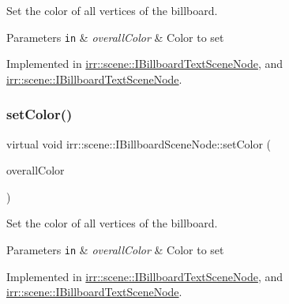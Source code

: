 Set the color of all vertices of the billboard. 


\begin{DoxyParams}[1]{Parameters}
\mbox{\tt in}  & {\em overall\+Color} & Color to set \\
\hline
\end{DoxyParams}


Implemented in \hyperlink{classirr_1_1scene_1_1IBillboardTextSceneNode_aaa65d10d3a49206728c47b148a64bb4a}{irr\+::scene\+::\+I\+Billboard\+Text\+Scene\+Node}, and \hyperlink{classirr_1_1scene_1_1IBillboardTextSceneNode_aaa65d10d3a49206728c47b148a64bb4a}{irr\+::scene\+::\+I\+Billboard\+Text\+Scene\+Node}.

\mbox{\label{classirr_1_1scene_1_1IBillboardSceneNode_a82c1038a6dfcd255863baa96aaba4182}} 
\subsubsection{\texorpdfstring{set\+Color()}{setColor()}\hspace{0.1cm}{\footnotesize\ttfamily [2/4]}}
{\footnotesize\ttfamily virtual void irr\+::scene\+::\+I\+Billboard\+Scene\+Node\+::set\+Color (\begin{DoxyParamCaption}\item[{const \hyperlink{classirr_1_1video_1_1SColor}{video\+::\+S\+Color} \&}]{overall\+Color }\end{DoxyParamCaption})\hspace{0.3cm}{\ttfamily [pure virtual]}}



Set the color of all vertices of the billboard. 


\begin{DoxyParams}[1]{Parameters}
\mbox{\tt in}  & {\em overall\+Color} & Color to set \\
\hline
\end{DoxyParams}


Implemented in \hyperlink{classirr_1_1scene_1_1IBillboardTextSceneNode_aaa65d10d3a49206728c47b148a64bb4a}{irr\+::scene\+::\+I\+Billboard\+Text\+Scene\+Node}, and \hyperlink{classirr_1_1scene_1_1IBillboardTextSceneNode_aaa65d10d3a49206728c47b148a64bb4a}{irr\+::scene\+::\+I\+Billboard\+Text\+Scene\+Node}.

